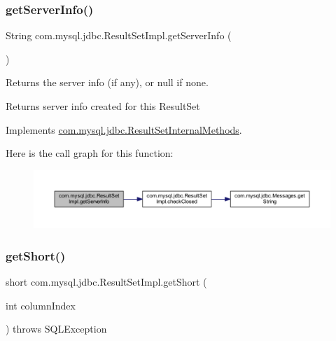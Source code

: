 \subsubsection{\texorpdfstring{get\+Server\+Info()}{getServerInfo()}}
{\footnotesize\ttfamily String com.\+mysql.\+jdbc.\+Result\+Set\+Impl.\+get\+Server\+Info (\begin{DoxyParamCaption}{ }\end{DoxyParamCaption})}

Returns the server info (if any), or null if none.

\begin{DoxyReturn}{Returns}
server info created for this Result\+Set 
\end{DoxyReturn}


Implements \mbox{\hyperlink{interfacecom_1_1mysql_1_1jdbc_1_1_result_set_internal_methods_add46fbb3bd5ecdfe2fa1fa77b3816425}{com.\+mysql.\+jdbc.\+Result\+Set\+Internal\+Methods}}.

Here is the call graph for this function\+:
\nopagebreak
\begin{figure}[H]
\begin{center}
\leavevmode
\includegraphics[width=350pt]{classcom_1_1mysql_1_1jdbc_1_1_result_set_impl_ab197af35d136130f30ba471848e1737d_cgraph}
\end{center}
\end{figure}
\mbox{\label{classcom_1_1mysql_1_1jdbc_1_1_result_set_impl_ac1ce7614ffee29fc12680bf7dd00e689}} 
\subsubsection{\texorpdfstring{get\+Short()}{getShort()}\hspace{0.1cm}{\footnotesize\ttfamily [1/2]}}
{\footnotesize\ttfamily short com.\+mysql.\+jdbc.\+Result\+Set\+Impl.\+get\+Short (\begin{DoxyParamCaption}\item[{int}]{column\+Index }\end{DoxyParamCaption}) throws S\+Q\+L\+Exception}

